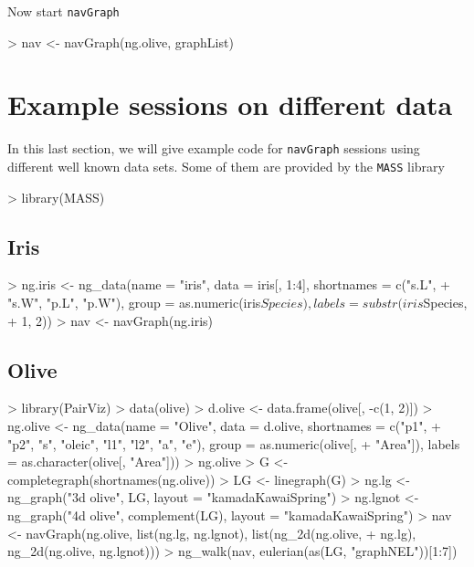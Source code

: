 \documentclass[12pt,oneside,titlepage,letter]{article}
\newcommand{\modify}[1]{{\color{blue}#1}}
\begin{document}
Now start \texttt{navGraph}
\begin{Schunk}
\begin{Sinput}
> nav <- navGraph(ng.olive, graphList)
\end{Sinput}
\end{Schunk}

\section{Example sessions on different data}
In this last section, we will give example code for \texttt{navGraph} sessions using different well known data sets. Some of them are provided by the \texttt{MASS} library

\begin{Schunk}
\begin{Sinput}
> library(MASS)
\end{Sinput}
\end{Schunk}

\subsection{Iris}
\begin{Schunk}
\begin{Sinput}
> ng.iris <- ng_data(name = "iris", data = iris[, 1:4], shortnames = c("s.L", 
+     "s.W", "p.L", "p.W"), group = as.numeric(iris$Species), labels = substr(iris$Species, 
+     1, 2))
> nav <- navGraph(ng.iris)
\end{Sinput}
\end{Schunk}

\subsection{Olive}
\begin{Schunk}
\begin{Sinput}
> library(PairViz)
> data(olive)
> d.olive <- data.frame(olive[, -c(1, 2)])
> ng.olive <- ng_data(name = "Olive", data = d.olive, shortnames = c("p1", 
+     "p2", "s", "oleic", "l1", "l2", "a", "e"), group = as.numeric(olive[, 
+     "Area"]), labels = as.character(olive[, "Area"]))
> ng.olive
> G <- completegraph(shortnames(ng.olive))
> LG <- linegraph(G)
> ng.lg <- ng_graph("3d olive", LG, layout = "kamadaKawaiSpring")
> ng.lgnot <- ng_graph("4d olive", complement(LG), layout = "kamadaKawaiSpring")
> nav <- navGraph(ng.olive, list(ng.lg, ng.lgnot), list(ng_2d(ng.olive, 
+     ng.lg), ng_2d(ng.olive, ng.lgnot)))
> ng_walk(nav, eulerian(as(LG, "graphNEL"))[1:7])
\end{Sinput}
\end{Schunk}
\end{document}

